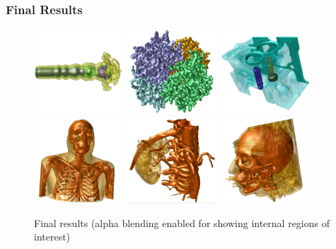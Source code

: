 \documentclass[8pt]{beamer}
\begin{document}
\begin{frame}
  \frametitle{Final Results}
\begin{figure}[H]
  \centering
    \includegraphics[width=0.3\textwidth]{images/result2-fuel}
    \includegraphics[width=0.3\textwidth]{images/result2-hemoglobin}
    \includegraphics[width=0.3\textwidth]{images/result2-engine}\\
    \includegraphics[width=0.3\textwidth]{images/result2-vh4}
    \includegraphics[width=0.3\textwidth]{images/result2-kidney}
    \includegraphics[width=0.3\textwidth]{images/result2-head}
  \caption{Final results (alpha blending enabled for showing internal regions of interest)}
  \label{fig:result-img2}
\end{figure}
  
\end{frame}
\note{}
\end{document}
